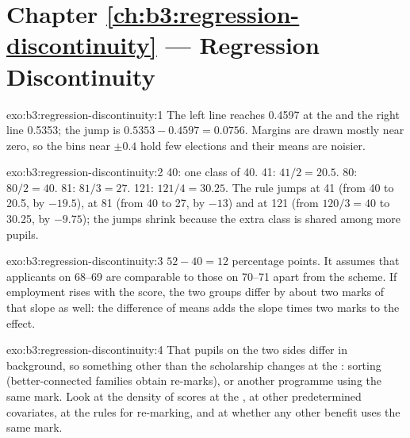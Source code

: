 \section*{Chapter \ref{ch:b3:regression-discontinuity} --- Regression Discontinuity}

\begin{solution}{exo:b3:regression-discontinuity:1}
The left line reaches 0.4597 at the  and the right line 0.5353; the jump is
$0.5353 - 0.4597 = 0.0756$. %
Margins are drawn mostly near zero, so the bins near $\pm 0.4$ hold few
elections and their means are noisier.
\end{solution}

\begin{solution}{exo:b3:regression-discontinuity:2}
40: one class of 40. 41: $41/2 = 20.5$. 80: $80/2 = 40$. 81: $81/3 = 27$. 121:
$121/4 = 30.25$. The rule jumps at 41 (from 40 to 20.5, by $-19.5$), at 81 (from 40
to 27, by $-13$) and at 121 (from $120/3 = 40$ to 30.25, by $-9.75$); the jumps
shrink because the extra class is shared among more pupils.
\end{solution}

\begin{solution}{exo:b3:regression-discontinuity:3}
$52 - 40 = 12$ percentage points. It assumes that applicants on 68--69 are
comparable to those on 70--71 apart from the scheme. If employment rises with the
score, the two groups differ by about two marks of that slope as well: the
difference of means adds the slope times two marks to the effect.
\end{solution}

\begin{solution}{exo:b3:regression-discontinuity:4}
That pupils on the two sides differ in background, so something other than the
scholarship changes at the : sorting (better-connected families obtain
re-marks), or another programme using the same mark. Look at the density of
scores at the , at other predetermined covariates, at the rules for
re-marking, and at whether any other benefit uses the same mark.
\end{solution}

